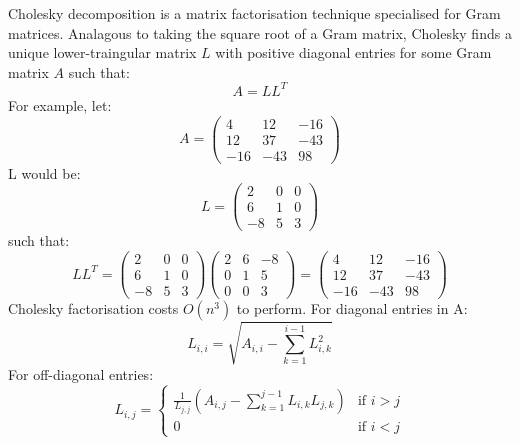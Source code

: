 Cholesky decomposition \cite{gp-ml} is a matrix factorisation technique specialised for Gram matrices. Analagous to taking the square root of a Gram matrix, Cholesky finds a unique lower-traingular matrix $L$ with positive diagonal entries for some Gram matrix $A$ such that:
\begin{equation} \label{eq:cholesky-factor}
    A = LL^T
\end{equation}
For example, let:
\begin{equation*}
    A = \begin{pmatrix}
        4 & 12 & -16 \\ 
        12 & 37 & -43 \\
        -16 & -43 & 98
    \end{pmatrix}
\end{equation*}
L would be:
\begin{equation*}
    L = \begin{pmatrix}
        2 & 0 & 0 \\
        6 & 1 & 0 \\
        -8 & 5 & 3 
    \end{pmatrix}
\end{equation*}
such that:
\begin{equation*}
    LL^T = \begin{pmatrix}
        2 & 0 & 0 \\
        6 & 1 & 0 \\
        -8 & 5 & 3 
    \end{pmatrix} \begin{pmatrix}
        2 & 6 & -8 \\
        0 & 1 & 5 \\
        0 & 0 & 3 
    \end{pmatrix} = \begin{pmatrix}
        4 & 12 & -16 \\ 
        12 & 37 & -43 \\
        -16 & -43 & 98
    \end{pmatrix}
\end{equation*}
Cholesky factorisation costs $O(n^3)$ to perform. For diagonal entries in A:
\begin{equation*}
    L_{i,i} = \sqrt{A_{i,i} - \sum_{k=1}^{i-1} L_{i,k}^2}
\end{equation*}
For off-diagonal entries:
\begin{equation*}
    L_{i,j} = \begin{cases}
        \frac{1}{L_{j,j}} \left( A_{i,j} - \sum_{k=1}^{j-1} L_{i,k} L_{j,k} \right) & \text{if } i > j \\
        0 & \text{if } i < j
    \end{cases}
\end{equation*}


